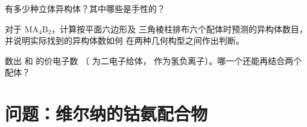 \begin{exercise}[$\star\star\star$]\label{exo:b2:coordination-complexes:10}
\ce{[CoCl2(en)2]+} 有多少种立体异构体？其中哪些是手性的？
\end{exercise}

\begin{exercise}[$\star\star\star$]\label{exo:b2:coordination-complexes:11}
对于 $\mathrm{MA_4B_2}$，计算按平面六边形及
三角棱柱排布六个配体时预测的异构体数目，并说明实际找到的异构体数如何
在两种几何构型之间作出判断。
\end{exercise}

\begin{exercise}[$\star\star\star$]\label{exo:b2:coordination-complexes:12}
数出  和  的价电子数
（ 为二电子给体， 作为氢负离子）。哪一个还能再结合两个
配体？
\end{exercise}

\section{问题：维尔纳的钴氨配合物}

